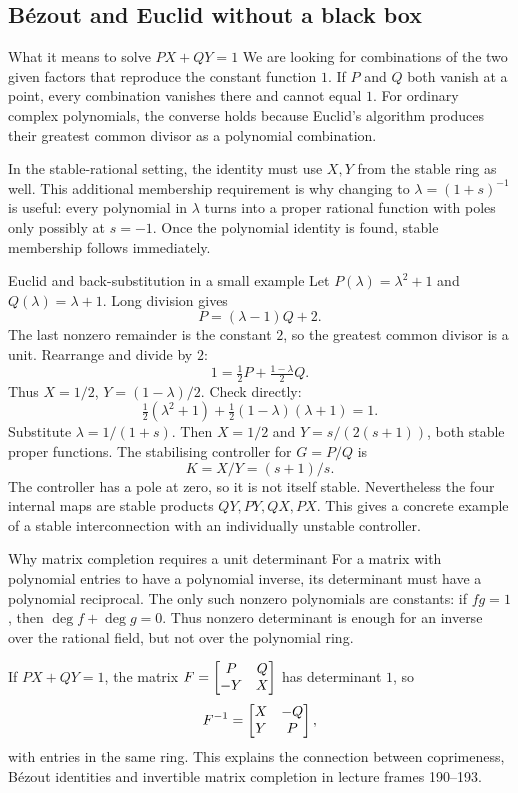 \subsection{B\'ezout and Euclid without a black box}
\begin{concept}{What it means to solve $PX+QY=1$}
We are looking for combinations of the two given factors that reproduce the constant function $1$. If $P$ and $Q$ both vanish at a point, every combination vanishes there and cannot equal $1$. For ordinary complex polynomials, the converse holds because Euclid's algorithm produces their greatest common divisor as a polynomial combination.

In the stable-rational setting, the identity must use $X,Y$ from the stable ring as well. This additional membership requirement is why changing to $\lambda=(1+s)^{-1}$ is useful: every polynomial in $\lambda$ turns into a proper rational function with poles only possibly at $s=-1$. Once the polynomial identity is found, stable membership follows immediately.
\end{concept}
\begin{worked}{Euclid and back-substitution in a small example}
Let $P(\lambda)=\lambda^2+1$ and $Q(\lambda)=\lambda+1$. Long division gives
\[P=(\lambda-1)Q+2.\]
The last nonzero remainder is the constant $2$, so the greatest common divisor is a unit. Rearrange and divide by $2$:
\[1=\tfrac12P+\tfrac{1-\lambda}{2}Q.\]
Thus $X=1/2$, $Y=(1-\lambda)/2$. Check directly:
\[\tfrac12(\lambda^2+1)+\tfrac12(1-\lambda)(\lambda+1)=1.\]
Substitute $\lambda=1/(1+s)$. Then $X=1/2$ and $Y=s/(2(s+1))$, both stable proper functions. The stabilising controller for $G=P/Q$ is
\[K=X/Y=(s+1)/s.\]
The controller has a pole at zero, so it is not itself stable. Nevertheless the four internal maps are stable products $QY,PY,QX,PX$. This gives a concrete example of a stable interconnection with an individually unstable controller.
\end{worked}
\begin{concept}{Why matrix completion requires a unit determinant}
For a matrix with polynomial entries to have a polynomial inverse, its determinant must have a polynomial reciprocal. The only such nonzero polynomials are constants: if $fg=1$, then $\deg f+\deg g=0$. Thus nonzero determinant is enough for an inverse over the rational field, but not over the polynomial ring.

If $PX+QY=1$, the matrix $F=\begin{bmatrix}P&Q\\-Y&X\end{bmatrix}$ has determinant $1$, so
\[F^{-1}=\begin{bmatrix}X&-Q\\Y&P\end{bmatrix},\]
with entries in the same ring. This explains the connection between coprimeness, B\'ezout identities and invertible matrix completion in lecture frames 190--193.
\end{concept}
